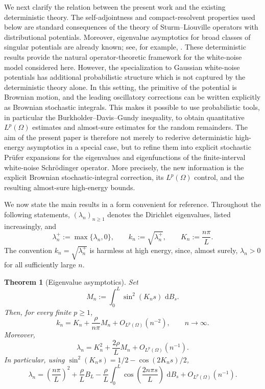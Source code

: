 \documentclass[11pt]{article}
\newtheorem{theorem}{Theorem}[section]
\newcommand{\dd}{\,\mathrm d}
\begin{document}
We next clarify the relation between the present work and the existing deterministic theory. The self-adjointness and compact-resolvent properties used below are standard consequences of the theory of Sturm--Liouville operators with distributional potentials. Moreover, eigenvalue asymptotics for broad classes of singular potentials are already known; see, for example, \cite{HrynivMykytyukJFA2006,EGNT}. These deterministic results provide the natural operator-theoretic framework for the white-noise model considered here. However, the specialization to Gaussian white-noise potentials has additional probabilistic structure which is not captured by the deterministic theory alone. In this setting, the primitive of the potential is Brownian motion, and the leading oscillatory corrections can be written explicitly as Brownian stochastic integrals. This makes it possible to use probabilistic tools, in particular the Burkholder--Davis--Gundy inequality, to obtain quantitative $L^p(\Omega)$ estimates and almost-sure estimates for the random remainders. The aim of the present paper is therefore not merely to rederive deterministic high-energy asymptotics in a special case, but to refine them into explicit stochastic Pr\"ufer expansions for the eigenvalues and eigenfunctions of the finite-interval white-noise Schr\"odinger operator. More precisely, the new information is the explicit Brownian stochastic-integral correction, its $L^p(\Omega)$ control, and the resulting almost-sure high-energy bounds.

We now state the main results in a form convenient for reference. Throughout the following statements, $(\lambda_n)_{n\ge1}$ denotes the Dirichlet eigenvalues, listed increasingly, and
\[
    \lambda_n^+:=\max\{\lambda_n,0\},\qquad
    k_n:=\sqrt{\lambda_n^+},\qquad
    K_n:=\frac{n\pi}{L}.
\]
The convention $k_n=\sqrt{\lambda_n^+}$ is harmless at high energy, since, almost surely, $\lambda_n>0$ for all sufficiently large $n$.

\begin{theorem}[Eigenvalue asymptotics]\label{thm:intro-eigenvalue}
Set
\[
    M_n:=\int_0^L \sin^2(K_ns)\,\dd B_s.
\]
Then, for every finite $p\ge1$,
\[
    k_n
    =K_n+\frac{\rho}{n\pi}M_n+O_{L^p(\Omega)}(n^{-2}),
    \qquad n\to\infty.
\]
Moreover,
\[
    \lambda_n
    =K_n^2+\frac{2\rho}{L}M_n+O_{L^p(\Omega)}(n^{-1}).
\]
In particular, using $\sin^2(K_ns)=1/2-\cos(2K_ns)/2$,
\[
    \lambda_n
    =\left(\frac{n\pi}{L}\right)^2
    +\frac{\rho}{L}B_L
    -\frac{\rho}{L}
    \int_0^L\cos\left(\frac{2n\pi s}{L}\right)\,\dd B_s
    +O_{L^p(\Omega)}(n^{-1}).
\]
\end{theorem}
\end{document}
